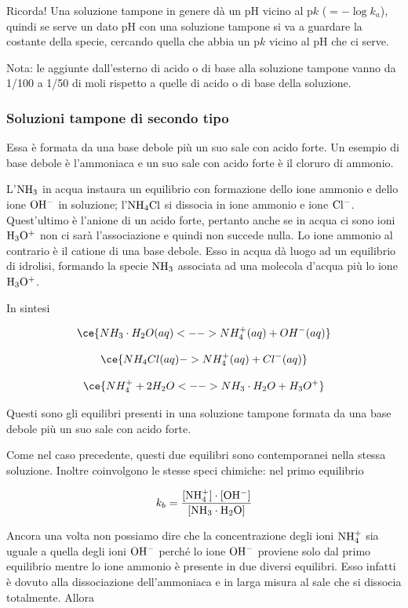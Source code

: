 \vspace{0.2cm}Ricorda! Una soluzione tampone in genere dà un pH vicino al p$k$ ($=-\log{k_a}$), quindi se serve un dato pH con una soluzione tampone si va a guardare la costante della specie, cercando quella che abbia un p$k$ vicino al pH che ci serve.

Nota: le aggiunte dall'esterno di acido o di base alla soluzione tampone vanno da 1/100 a 1/50 di moli rispetto a quelle di acido o di base della soluzione.

\subsubsection{Soluzioni tampone di secondo tipo}
Essa è formata da una base debole più un suo sale con acido forte. Un esempio di base debole è l'ammoniaca e un suo sale con acido forte è il cloruro di ammonio.

L'$\rm NH_3$ in acqua instaura un equilibrio con formazione dello ione ammonio e dello ione $\rm OH^-$ in soluzione; l'$\rm NH_4Cl$ si dissocia in ione ammonio e ione $\rm Cl^-$. Quest'ultimo è l'anione di un acido forte, pertanto anche se in acqua ci sono ioni $\rm H_3O^+$ non ci sarà l'associazione e quindi non succede nulla. Lo ione ammonio al contrario è il catione di una base debole. Esso in acqua dà luogo ad un equilibrio di idrolisi, formando la specie $\rm NH_3$ associata ad una molecola d'acqua più lo ione $\rm H_3O^+$.

In sintesi

$$\ce{NH_3 \cdot H_2O(aq) <--> NH_4^+(aq) + OH^-(aq)}$$

$$\ce{NH_4Cl(aq) -> NH_4^+(aq) + Cl^-(aq)}$$

$$\ce{NH_4^+ + 2H_2O <--> NH_3 \cdot H_2O + H_3O^+}$$

Questi sono gli equilibri presenti in una soluzione tampone formata da una base debole più un suo sale con acido forte.

Come nel caso precedente, questi due equilibri sono contemporanei nella stessa soluzione. Inoltre coinvolgono le stesse speci chimiche: nel primo equilibrio

$$k_b = \rm{\frac{[NH_4^+] \cdot [OH^-]}{[NH_3 \cdot H_2O]}}$$

Ancora una volta non possiamo dire che la concentrazione degli ioni $\rm NH_4^+$ sia uguale a quella degli ioni $\rm OH^-$ perché lo ione $\rm OH^-$ proviene solo dal primo equilibrio mentre lo ione ammonio è presente in due diversi equilibri. Esso infatti è dovuto alla dissociazione dell'ammoniaca e in larga misura al sale che si dissocia totalmente. Allora 

